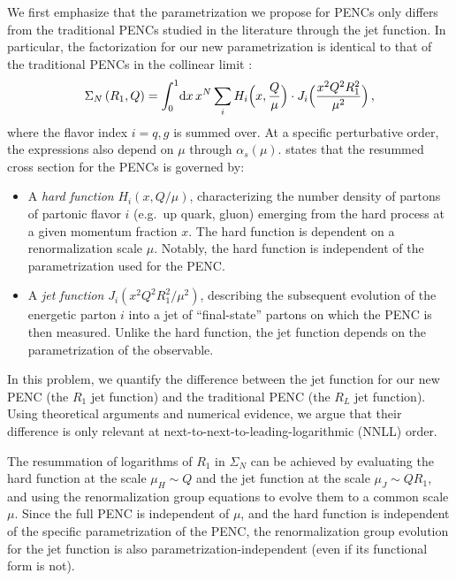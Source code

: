 We first emphasize that the parametrization we propose for PENCs only differs from the traditional PENCs studied in the literature through the jet function.
%
In particular, the factorization for our new parametrization is identical to that of the traditional PENCs in the collinear limit \cite{Dixon:2019uzg, Chen:2020vvp}:
\begin{align} \label{eq:fact}
    \Sigma_N
    \left(
    R_1, Q
    \right)
    =
    \int_0^1\!
    \dd x\,
    x^N
    \sum_i H_i
    \Bigl(x,\frac{Q}{\mu}\Bigr) \cdot
    J_i
    \Bigl( \frac{x^2 Q^2R_1^2}{\mu^2} \Bigr)
    \,,
\end{align}
where the flavor index \(i = q,g\)  is summed over.
%
At a specific perturbative order, the expressions also depend on $\mu$ through $\alpha_s(\mu)$.
%
 states that the resummed cross section for the PENCs %
is governed by:
\begin{itemize}
    \item
    A \textit{hard function} \(H_i(x, Q/\mu)\), characterizing the number density of partons of partonic flavor \(i\) (e.g.\ up quark, gluon) emerging from the hard process at a given momentum fraction \(x\).
    The hard function is dependent on a renormalization scale \(\mu\).
    Notably, the hard function is independent of the parametrization used for the PENC.

    \item
    A \textit{jet function} \(J_i( x^2 Q^2R_1^2/\mu^2 )\), describing the subsequent evolution of the energetic parton \(i\)
    into a jet of ``final-state'' partons on which the PENC is then measured.
    Unlike the hard function, the jet function depends on the parametrization of the observable.
\end{itemize}
%
In this problem, we quantify the difference between the jet function for our new PENC (the \(R_1\) jet function) and the traditional PENC (the \(R_L\) jet function). Using theoretical arguments and numerical evidence, we argue that their difference is only relevant at next-to-next-to-leading-logarithmic (NNLL) order.

The resummation of logarithms of $R_1$ in $\Sigma_N$ can be achieved by evaluating the hard function at the scale $\mu_H \sim Q$ and the jet function at the scale $\mu_J \sim Q R_1$, and using the renormalization group equations to evolve them to a common scale $\mu$.
%
Since the full PENC is independent of \(\mu\), and the hard function is independent of the specific parametrization of the PENC, the renormalization group evolution for the jet function is also parametrization-independent (even if its functional form is not).


